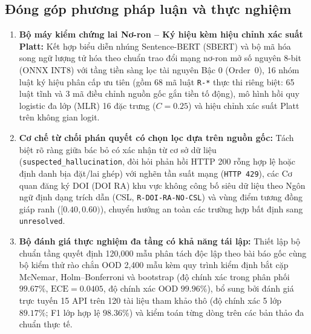 \subsection{Đóng góp phương pháp luận và thực nghiệm}
\begin{enumerate}
    \item \textbf{Bộ máy kiểm chứng lai Nơ-ron -- Ký hiệu kèm hiệu chỉnh xác suất Platt:} Kết hợp biểu diễn nhúng Sentence-BERT (SBERT) và bộ mã hóa song ngữ lượng tử hóa theo chuẩn trao đổi mạng nơ-ron mở số nguyên 8-bit (ONNX INT8) với tầng tiền sàng lọc tài nguyên Bậc 0 (Order~0), 16 nhóm luật ký hiệu phân cấp ưu tiên (gồm 68 mã luật \texttt{R-*} thực thi riêng biệt: 65 luật tĩnh và 3 mã điều chỉnh nguồn gốc gắn tiền tố động), mô hình hồi quy logistic đa lớp (MLR) 16 đặc trưng ($C = 0.25$) và hiệu chỉnh xác suất Platt trên không gian logit.
    \item \textbf{Cơ chế từ chối phán quyết có chọn lọc dựa trên nguồn gốc:} Tách biệt rõ ràng giữa bác bỏ có xác nhận từ cơ sở dữ liệu (\texttt{suspected\_hallucination}, đòi hỏi phản hồi HTTP 200 rỗng hợp lệ hoặc định danh bịa đặt/lai ghép) với nghẽn tần suất mạng (\texttt{HTTP 429}), các Cơ quan đăng ký DOI (DOI RA) khu vực không công bố siêu dữ liệu theo Ngôn ngữ định dạng trích dẫn (CSL, \texttt{R-DOI-RA-NO-CSL}) và vùng điểm tương đồng giáp ranh ($[0.40, 0.60)$), chuyển hướng an toàn các trường hợp bất định sang \texttt{unresolved}.
    \item \textbf{Bộ đánh giá thực nghiệm đa tầng có khả năng tái lập:} Thiết lập bộ chuẩn tầng quyết định 120,000 mẫu phân tách độc lập theo bài báo gốc cùng bộ kiểm thử rào chắn OOD 2,400 mẫu kèm quy trình kiểm định bắt cặp McNemar, Holm--Bonferroni và bootstrap (độ chính xác trong phân phối $99.67\%$, $\text{ECE} = 0.0405$, độ chính xác OOD $99.96\%$), bổ sung bởi đánh giá trực tuyến 15 API trên 120 tài liệu tham khảo thô (độ chính xác 5 lớp $89.17\%$; F1 lớp hợp lệ $98.36\%$) và kiểm toán từng dòng trên các bản thảo đa chuẩn thực tế.
\end{enumerate}

